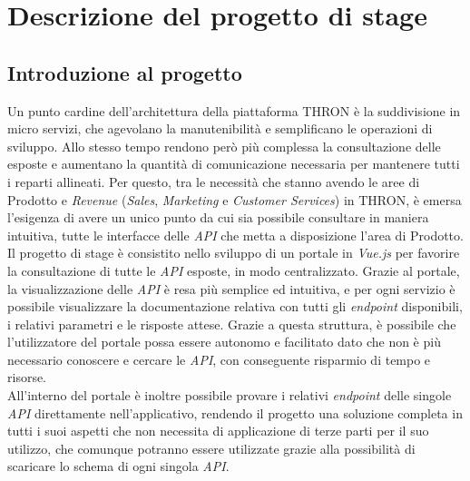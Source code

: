 \chapter{Descrizione del progetto di stage}\label{cap:descrizione-stage}


\section{Introduzione al progetto}\label{sec:introduzione-progetto}
Un punto cardine dell'architettura della piattaforma THRON è la suddivisione in micro servizi, che agevolano la manutenibilità e semplificano le operazioni di sviluppo.
Allo stesso tempo rendono però più complessa la consultazione delle  esposte e aumentano la quantità di comunicazione necessaria per mantenere tutti i reparti allineati.
Per questo, tra le necessità che stanno avendo le aree di Prodotto e \textit{Revenue} (\textit{Sales}, \textit{Marketing} e \textit{Customer Services}) in THRON, è emersa l'esigenza di avere un unico punto
da cui sia possibile consultare in maniera intuitiva, tutte le interfacce delle \textit{API} che metta a disposizione l'area di Prodotto.\\
Il progetto di stage è consistito nello sviluppo di un portale in \textit{Vue.js} per favorire la consultazione di tutte le \textit{API} esposte, in modo centralizzato.
Grazie al portale, la visualizzazione delle \textit{API} è resa più semplice ed intuitiva, e per ogni servizio è possibile visualizzare la documentazione relativa 
con tutti gli \textit{endpoint} disponibili, i relativi parametri e le risposte attese. Grazie a questa struttura, è possibile che l'utilizzatore del portale possa essere autonomo 
e facilitato dato che non è più necessario conoscere e cercare le \textit{API}, con conseguente risparmio di tempo e risorse.\\
All'interno del portale è inoltre possibile provare i relativi \textit{endpoint} delle singole \textit{API} direttamente nell'applicativo, rendendo il progetto una soluzione completa
in tutti i suoi aspetti che non necessita di applicazione di terze parti per il suo utilizzo, che comunque potranno essere utilizzate grazie alla possibilità di scaricare
lo schema  di ogni singola \textit{API}.


